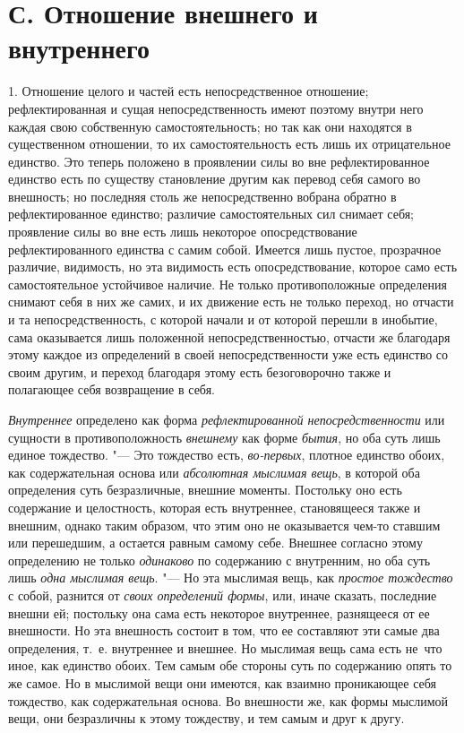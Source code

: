 \section[С. Отношение внешнего и внутреннего]
{С. Отношение внешнего и внутреннего}

1. Отношение целого и частей есть
непосредственное отношение; рефлектированная и сущая непосредственность
имеют поэтому внутри него каждая свою собственную самостоятельность; но так
как они находятся в существенном отношении, то их самостоятельность есть
лишь их отрицательное единство. Это теперь положено в проявлении силы во
вне рефлектированное единство есть по существу становление другим как
перевод себя самого во внешность; но последняя столь же непосредственно
вобрана обратно в рефлектированное единство; различие самостоятельных сил
снимает себя; проявление силы во вне есть лишь некоторое опосредствование
рефлектированного единства с самим собой. Имеется лишь пустое, прозрачное
различие, видимость, но эта видимость есть опосредствование, которое само
есть самостоятельное устойчивое наличие. Не только противоположные
определения снимают себя в них же самих, и их движение есть не только
переход, но отчасти и та непосредственность, с которой начали и от которой
перешли в инобытие, сама оказывается лишь положенной непосредственностью,
отчасти же благодаря этому каждое из определений в своей непосредственности
уже есть единство со своим другим, и переход благодаря этому есть
безоговорочно также и полагающее себя возвращение в себя.

{\em Внутреннее} определено как форма
{\em рефлектированной непосредственности} или сущности
в противоположность {\em внешнему} как форме
{\em бытия}, но оба суть лишь единое тождество. "--- Это
тождество есть, {\em во-первых}, плотное единство
обоих, как содержательная основа или {\em абсолютная
мыслимая вещь}, в которой оба определения суть безразличные, внешние
моменты. Постольку оно есть содержание и целостность, которая есть
внутреннее, становящееся также и внешним, однако таким образом, что этим
оно не оказывается чем-то ставшим или перешедшим, а остается равным самому
себе. Внешнее согласно этому определению не только
{\em одинаково} по содержанию с внутренним, но оба суть
лишь {\em одна мыслимая вещь}. "--- Но эта мыслимая вещь,
как {\em простое тождество} с собой, разнится от
{\em своих определений формы}, или, иначе сказать,
последние внешни ей; постольку она сама есть некоторое внутреннее,
разнящееся от ее внешности. Но эта внешность состоит в том, что ее
составляют эти самые два определения, т.~е. внутреннее и внешнее. Но
мыслимая вещь сама есть не~что иное, как единство обоих. Тем самым обе
стороны суть по содержанию опять то же самое. Но в мыслимой вещи они
имеются, как взаимно проникающее себя тождество, как содержательная основа.
Во внешности же, как формы мыслимой вещи, они безразличны к этому
тождеству, и тем самым и друг к другу.

